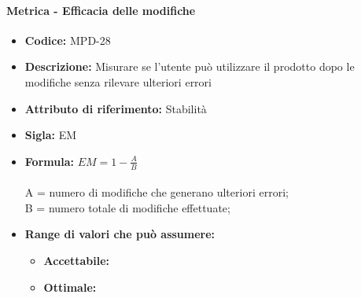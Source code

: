                  \paragraph{Metrica - Efficacia delle modifiche} 
            \begin{itemize}
            \item  \textbf{Codice:} MPD-28
            \item  \textbf{Descrizione:} Misurare se l'utente può utilizzare il prodotto dopo le modifiche senza rilevare ulteriori errori
            \item   \textbf{Attributo di riferimento:} Stabilità
           \item   \textbf{Sigla:} EM
           \item   \textbf{Formula:} \begin{math}EM = 1 - \frac{A}{B}\end{math}\\ \\
            A = numero di modifiche che generano ulteriori errori;\\
            B = numero totale di modifiche effettuate;
            \item \textbf{Range di valori che può assumere:}
        \begin{itemize}
            \item \textbf{Accettabile:} 
            \item \textbf{Ottimale:} 
        \end{itemize}
       \end{itemize}

